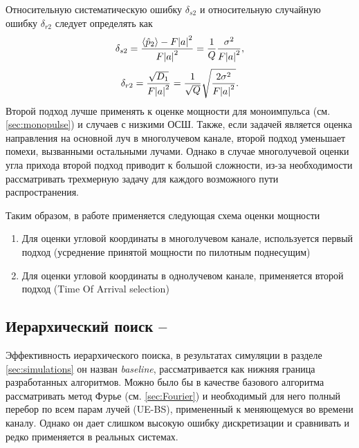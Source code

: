 Относительную систематическую ошибку $\delta_{s2}$ и относительную случайную ошибку $\delta_{r2}$ следует
определять как
\begin{equation}
    \delta_{s2} = \frac{\langle \hat p_2 \rangle - F \abs{a}^2}{F \abs{a}^2} = \frac{1}{Q} \frac{\sigma^2}{F\abs{a}^2},
\end{equation}
\begin{equation}
    \delta_{r2} = \frac{\sqrt{D_1}}{F\abs{a}^2} = \frac{1}{\sqrt Q} \sqrt{\frac{2\sigma^2}{F\abs{a}^2}}.
\end{equation}
Второй подход лучше применять к оценке мощности для моноимпульса (см. \ref{sec:monopulse}) и случаев с
низкими ОСШ. Также, если задачей является оценка направления на основной луч в
многолучевом канале, второй подход уменьшает помехи, вызванными остальными лучами.
Однако в случае многолучевой оценки угла прихода второй подход приводит к
большой сложности, из-за необходимости рассматривать трехмерную задачу для
каждого возможного пути распространения.

Таким образом, в работе применяется следующая схема оценки мощности
\begin{enumerate}
    \item Для оценки угловой координаты в многолучевом канале, используется первый подход (усреднение принятой мощности по пилотным поднесущим) \\
    \item Для оценки угловой координаты в однолучевом канале, применяется второй подход (Time Of Arrival selection) \\
\end{enumerate}



\subsection[Иерархический поиск]{Иерархический поиск -- \baseline}
\label{sec:hSearch}\label{sec:hierarchy:search}
Эффективность иерархического поиска, в результатах симуляции в разделе
\ref{sec:simulations} он назван \textit{baseline}, рассматривается как нижняя
граница разработанных алгоритмов.  Можно было бы в качестве базового алгоритма
рассматривать метод Фурье (см. \ref{sec:Fourier}) и необходимый для него полный
перебор по всем парам лучей (UE-BS), примененный к меняющемуся во времени
каналу.  Однако он дает слишком высокую ошибку дискретизации и сравнивать и
редко применяется в реальных системах.

